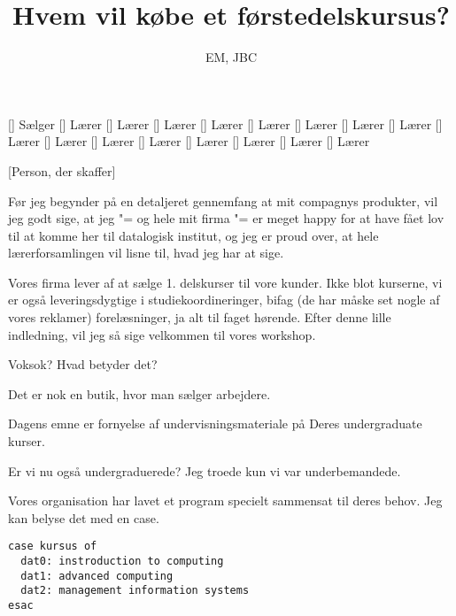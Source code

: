 \documentclass[a4paper,11pt]{article}
\title{Hvem vil købe et førstedelskursus?}
\author{EM, JBC}
\begin{document}
\maketitle

\begin{roles}
[] Sælger
[] Lærer
[] Lærer
[] Lærer
[] Lærer
[] Lærer
[] Lærer
[] Lærer
[] Lærer
[] Lærer
[] Lærer
[] Lærer
[] Lærer
[] Lærer
[] Lærer
[] Lærer
[] Lærer
\end{roles}

\begin{props}
[Person, der skaffer]
\end{props}


\begin{sketch}


   Før jeg begynder på en detaljeret gennemfang at mit
  compagnys produkter, vil jeg godt sige, at jeg "= og hele mit firma
  "= er meget happy for at have fået lov til at komme her til
  datalogisk institut, og jeg er proud over, at hele lærerforsamlingen
  vil lisne til, hvad jeg har at sige.

  Vores firma lever af at sælge 1. delskurser til vore kunder.  Ikke
  blot kurserne, vi er også leveringsdygtige i studiekoordineringer,
  bifag (de har måske set nogle af vores reklamer) forelæsninger, ja
  alt til faget hørende.  Efter denne lille indledning, vil jeg så
  sige velkommen til vores workshop.

 Voksok?  Hvad betyder det?

 Det er nok en butik, hvor man sælger arbejdere.

 Dagens emne er fornyelse af undervisningsmateriale på Deres
undergraduate kurser.

 Er vi nu også undergraduerede?  Jeg troede kun vi var underbemandede.

 Vores organisation har lavet et program specielt sammensat
til deres behov.  Jeg kan belyse det med en case.


\begin{verbatim}
case kursus of
  dat0: instroduction to computing
  dat1: advanced computing
  dat2: management information systems
esac
\end{verbatim}


\end{sketch}
\end{document}
